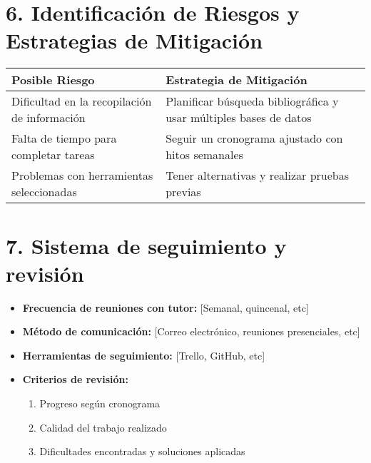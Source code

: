 \documentclass[12pt, a4paper]{article}
\begin{document}
\section*{6. Identificación de Riesgos y Estrategias de Mitigación}
\begin{tabularx}{\textwidth}{|l|X|}
    \hline
    \textbf{Posible Riesgo} & \textbf{Estrategia de Mitigación} \\ \hline
    Dificultad en la recopilación de información & Planificar búsqueda bibliográfica y usar múltiples bases de datos \\ \hline
    Falta de tiempo para completar tareas & Seguir un cronograma ajustado con hitos semanales \\ \hline
    Problemas con herramientas seleccionadas & Tener alternativas y realizar pruebas previas \\ \hline
\end{tabularx}

\section*{7. Sistema de seguimiento y revisión}
\begin{itemize}
    \item \textbf{Frecuencia de reuniones con tutor:} [Semanal, quincenal, etc]
    \item \textbf{Método de comunicación:} [Correo electrónico, reuniones presenciales, etc]
    \item \textbf{Herramientas de seguimiento:} [Trello, GitHub, etc]
    \item \textbf{Criterios de revisión:}
    \begin{enumerate}
        \item Progreso según cronograma
        \item Calidad del trabajo realizado
        \item Dificultades encontradas y soluciones aplicadas
    \end{enumerate}
\end{itemize}
\end{document}
